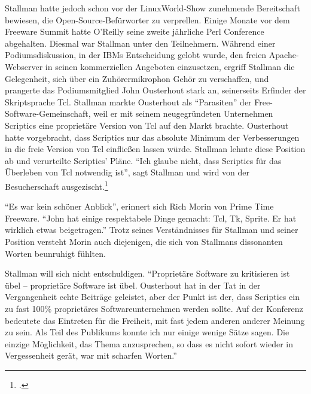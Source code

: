 Stallman hatte jedoch schon vor der LinuxWorld-Show zunehmende Bereitschaft bewiesen, die Open-Source-Befürworter zu verprellen. Einige Monate vor dem Freeware Summit hatte O'Reilly seine zweite jährliche Perl Conference abgehalten. Diesmal war Stallman unter den Teilnehmern. Während einer Podiumsdiskussion, in der IBMs Entscheidung gelobt wurde, den freien Apache-Webserver in seinen kommerziellen Angeboten einzusetzen, ergriff Stallman die Gelegenheit, sich über ein Zuhörermikrophon Gehör zu verschaffen, und prangerte das Podiumsmitglied John Ousterhout stark an, seinerseits Erfinder der Skriptsprache Tcl. Stallman markte Ousterhout als "`Parasiten"' der Free-Software-Gemeinschaft, weil er mit seinem neugegründeten Unternehmen Scriptics eine proprietäre Version von Tcl auf den Markt brachte. Ousterhout hatte vorgebracht, dass Scriptics nur das absolute Minimum der Verbesserungen in die freie Version von Tcl einfließen lassen würde.
Stallman lehnte diese Position ab und verurteilte Scriptics' Pläne. "`Ich glaube nicht, dass Scriptics für das Überleben von Tcl notwendig ist"', sagt Stallman und wird von der Besucherschaft ausgezischt.\footcite{profitmot}

"`Es war kein schöner Anblick"', erinnert sich Rich Morin von Prime Time Freeware. "`John hat einige respektabele Dinge gemacht: Tcl, Tk, Sprite. Er hat wirklich etwas beigetragen."' Trotz seines Verständnisses für Stallman und seiner Position versteht Morin auch diejenigen, die sich von Stallmans dissonanten Worten beunruhigt fühlten.

Stallman will sich nicht entschuldigen. "`Proprietäre Software zu kritisieren ist übel – proprietäre Software ist übel. Ousterhout hat in der Tat in der Vergangenheit echte Beiträge geleistet, aber der Punkt ist der, dass Scriptics ein zu fast 100\% proprietäres Softwareunternehmen werden sollte.\footnotemark{} Auf der Konferenz bedeutete das Eintreten für die Freiheit, mit fast jedem anderen anderer Meinung zu sein. Als Teil des Publikums konnte ich nur einige wenige Sätze sagen. Die einzige Möglichkeit, das Thema anzusprechen, so dass es nicht sofort wieder in Vergessenheit gerät, war mit scharfen Worten."'

